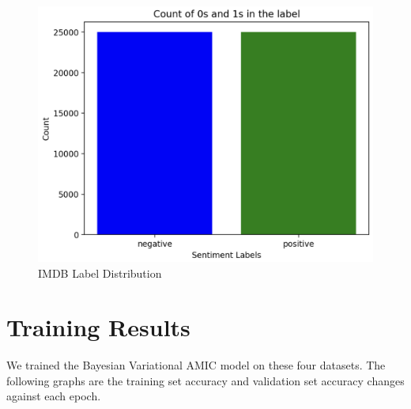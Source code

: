\documentclass{article}
\begin{document}
\begin{figure}[H]
    \centering
    \includegraphics[width=0.5\linewidth]{IMDB labels.png}
    \caption{IMDB Label Distribution}
    \label{fig:imdb_label}
\end{figure}

\section{Training Results}
We trained the Bayesian Variational AMIC model on these four datasets. The following graphs are the training set accuracy and validation set accuracy changes against each epoch.   
\end{document}
